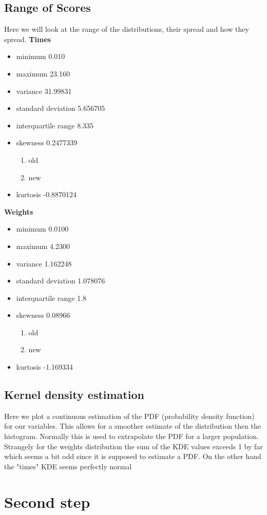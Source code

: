\documentclass[12pt,twocolumn]{article} %
\begin{document}
\subsection{Range of Scores}
Here we will look at the range of the distributions, their spread and how they spread.
\textbf{Times}
\begin{itemize}
\item minimum 0.010
\item maximum 23.160
\item variance 31.99831
\item standard deviation 5.656705
\item interquartile range 8.335
\item skewness 0.2477339
\begin{enumerate}
\item old
\item new
\end{enumerate}
\item kurtosis -0.8870124
\end{itemize}
\textbf{Weights}
\begin{itemize}
\item minimum 0.0100
\item maximum 4.2300
\item variance 1.162248
\item standard deviation 1.078076
\item interquartile range 1.8
\item skewness 0.08966
\begin{enumerate}
\item old
\item new
\end{enumerate}
\item kurtosis -1.169334
\end{itemize}
\subsection{Kernel density estimation}
Here we plot a continuous estimation of the PDF (probability density function) for our variables. This allows for a smoother estimate of the distribution then the histogram. Normally this is used to extrapolate the PDF for a larger population.
Strangely for the weights distribution the sum of the KDE values exceeds 1 by far which seems a bit odd since it is supposed to estimate a PDF. On the other hand the "times" KDE seems perfectly normal
\section{Second step}
\end{document}
